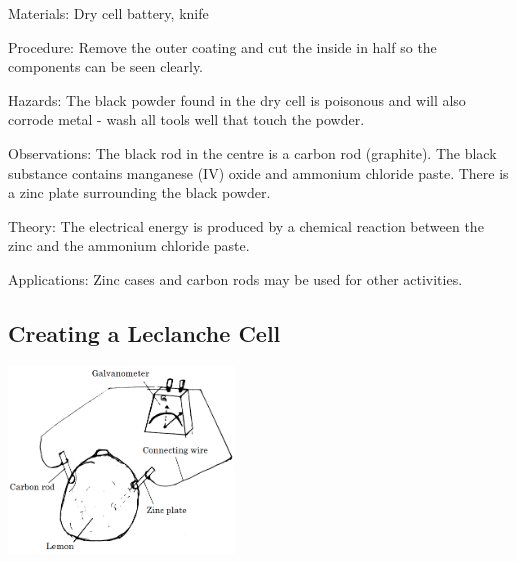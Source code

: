 \begin{multicols}{2}
\begin{description*}
\item[Materials:]{Dry cell battery, knife}
\item[Procedure:]{Remove the outer coating and cut the inside in half so the components can be seen clearly.}
\item[Hazards:]{The black powder found in the dry cell is poisonous and will also corrode metal - wash all tools well that touch the powder.}
\item[Observations:]{The black rod in the centre is a carbon rod (graphite). The black substance contains manganese (IV) oxide and ammonium chloride paste. There is a zinc plate surrounding the black powder.}
\item[Theory:]{The electrical energy is produced by a chemical reaction between the zinc and the ammonium chloride paste.}
\item[Applications:]{Zinc cases and carbon rods may be used for other activities.}
\end{description*}

\vfill
\columnbreak

\subsection{Creating a Leclanche Cell}

\begin{center}
\includegraphics[width=0.45\textwidth]{./img/lechlanche-cell.png}
\end{center}


\end{multicols}
